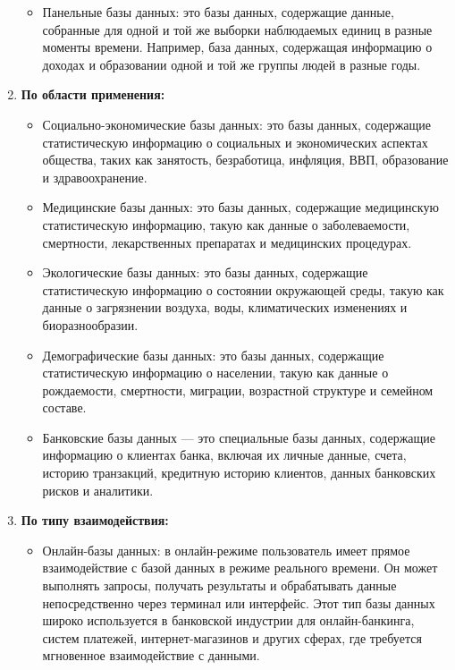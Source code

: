 \begin{enumerate}
\begin{itemize}
        \item Панельные базы данных: это базы данных, содержащие данные, собранные для одной и той же выборки наблюдаемых единиц в разные моменты времени. Например, база данных, содержащая информацию о доходах и образовании одной и той же группы людей в разные годы.
    \end{itemize}
    \item \textbf{По области применения:} \begin{itemize}
        \item Социально-экономические базы данных: это базы данных, содержащие статистическую информацию о социальных и экономических аспектах общества, таких как занятость, безработица, инфляция, ВВП, образование и здравоохранение.
        \item Медицинские базы данных: это базы данных, содержащие медицинскую статистическую информацию, такую как данные о заболеваемости, смертности, лекарственных препаратах и медицинских процедурах.
        \item Экологические базы данных: это базы данных, содержащие статистическую информацию о состоянии окружающей среды, такую как данные о загрязнении воздуха, воды, климатических изменениях и биоразнообразии.
        \item Демографические базы данных: это базы данных, содержащие статистическую информацию о населении, такую как данные о рождаемости, смертности, миграции, возрастной структуре и семейном составе.
        \item Банковские базы данных — это специальные базы данных, содержащие информацию о клиентах банка, включая их личные данные, счета, историю транзакций, кредитную историю клиентов, данных банковских рисков и аналитики.
    \end{itemize}
    \item \textbf{По типу взаимодействия:} \begin{itemize}
        \item Онлайн-базы данных: в онлайн-режиме пользователь имеет прямое взаимодействие с базой данных в режиме реального времени. Он может выполнять запросы, получать результаты и обрабатывать данные непосредственно через терминал или интерфейс. Этот тип базы данных широко используется в банковской индустрии для онлайн-банкинга, систем платежей, интернет-магазинов и других сферах, где требуется мгновенное взаимодействие с данными.


\end{itemize}
\end{enumerate}
